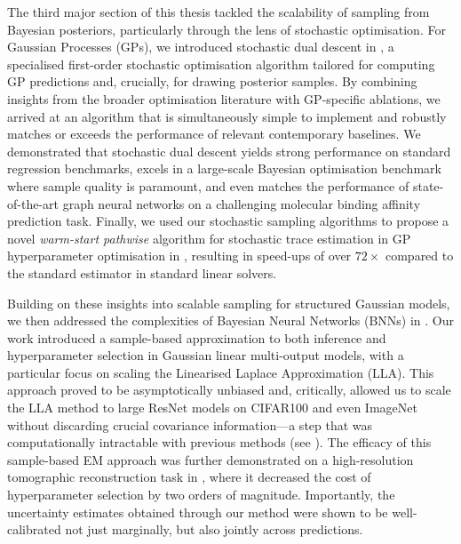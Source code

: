 The third major section of this thesis tackled the scalability of sampling from Bayesian posteriors, particularly through the lens of stochastic optimisation. For Gaussian Processes (GPs), we introduced stochastic dual descent in , a specialised first-order stochastic optimisation algorithm tailored for computing GP predictions and, crucially, for drawing posterior samples. By combining insights from the broader optimisation literature with GP-specific ablations, we arrived at an algorithm that is simultaneously simple to implement and robustly matches or exceeds the performance of relevant contemporary baselines. We demonstrated that stochastic dual descent yields strong performance on standard regression benchmarks, excels in a large-scale Bayesian optimisation benchmark where sample quality is paramount, and even matches the performance of state-of-the-art graph neural networks on a challenging molecular binding affinity prediction task. Finally, we used our stochastic sampling algorithms to propose a novel \emph{warm-start pathwise} algorithm for stochastic trace estimation in GP hyperparameter optimisation in , resulting in speed-ups of over $72\times$ compared to the standard estimator in standard linear solvers.

Building on these insights into scalable sampling for structured Gaussian models, we then addressed the complexities of Bayesian Neural Networks (BNNs) in . Our work introduced a sample-based approximation to both inference and hyperparameter selection in Gaussian linear multi-output models, with a particular focus on scaling the Linearised Laplace Approximation (LLA). This approach proved to be asymptotically unbiased and, critically, allowed us to scale the LLA method to large ResNet models on CIFAR100 and even ImageNet without discarding crucial covariance information—a step that was computationally intractable with previous methods (see ). The efficacy of this sample-based EM approach was further demonstrated on a high-resolution tomographic reconstruction task in , where it decreased the cost of hyperparameter selection by two orders of magnitude. Importantly, the uncertainty estimates obtained through our method were shown to be well-calibrated not just marginally, but also jointly across predictions.


